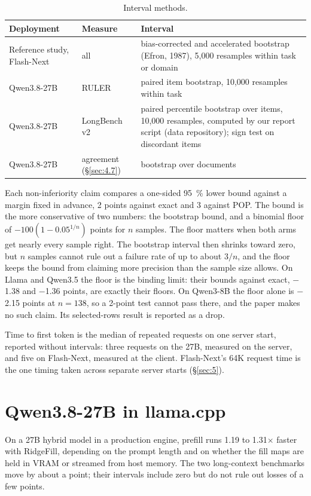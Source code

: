 \documentclass[11pt]{article}
\begin{document}
\begin{table}[!htbp]
\centering
\caption{Interval methods.}\label{tab:7}
\footnotesize
\setlength{\tabcolsep}{4pt}
\begin{tabularx}{\linewidth}{>{\raggedright\arraybackslash\hsize=0.698\hsize}X>{\raggedright\arraybackslash\hsize=0.491\hsize}X>{\raggedright\arraybackslash\hsize=1.810\hsize}X}
\toprule
Deployment & Measure & Interval \\
\midrule
Reference study, Flash-Next & all & bias-corrected and accelerated bootstrap (Efron, 1987), 5,000 resamples within task or domain \\
Qwen3.8-27B & RULER & paired item bootstrap, 10,000 resamples within task \\
Qwen3.8-27B & LongBench v2 & paired percentile bootstrap over items, 10,000 resamples, computed by our report script (data repository); sign test on discordant items \\
Qwen3.8-27B & agreement (\S\ref{sec:4.7}) & bootstrap over documents \\
\bottomrule
\end{tabularx}
\end{table}

Each non-inferiority claim compares a one-sided 95~\% lower bound against a margin fixed in advance, 2 points against exact and 3 against POP. The bound is the more conservative of two numbers: the bootstrap bound, and a binomial floor of $-100(1 - 0.05^{1/n})$ points for $n$ samples. The floor matters when both arms get nearly every sample right. The bootstrap interval then shrinks toward zero, but $n$ samples cannot rule out a failure rate of up to about $3/n$, and the floor keeps the bound from claiming more precision than the sample size allows. On Llama and Qwen3.5 the floor is the binding limit: their bounds against exact, $-$1.38 and $-$1.36 points, are exactly their floors. On Qwen3-8B the floor alone is $-$2.15 points at $n = 138$, so a 2-point test cannot pass there, and the paper makes no such claim. Its selected-rows result is reported as a drop.

Time to first token is the median of repeated requests on one server start, reported without intervals: three requests on the 27B, measured on the server, and five on Flash-Next, measured at the client. Flash-Next's 64K request time is the one timing taken across separate server starts (\S\ref{sec:5}).


\section{Qwen3.8-27B in llama.cpp}\label{sec:4}
On a 27B hybrid model in a production engine, prefill runs 1.19 to 1.31$\times$ faster with RidgeFill, depending on the prompt length and on whether the fill maps are held in VRAM or streamed from host memory. The two long-context benchmarks move by about a point; their intervals include zero but do not rule out losses of a few points.
\end{document}
